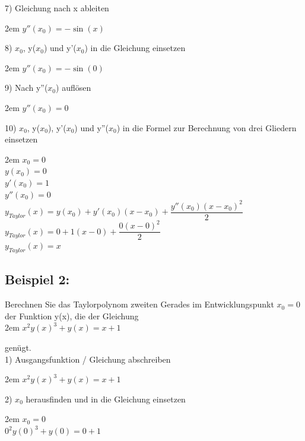 \documentclass[11pt,final]{scrreprt}
\newcommand{\br} {\medskip\\}
\begin{document}
7) Gleichung nach x ableiten

\begingroup
\leftskip2em 
$ y''(x_0) = -\sin(x) $
\par	
\endgroup 

8) $x_0$, y($x_0$) und y'($x_0$) in die Gleichung einsetzen

\begingroup
\leftskip2em 
$y''(x_0) = -\sin(0)$
\par	
\endgroup 

9) Nach y''($x_0$) auflösen

\begingroup
\leftskip2em 
$ y''(x_0) = 0 $\\
\par	
\endgroup 

10) $x_0$, y($x_0$), y'($x_0$) und y''($x_0$) in die Formel zur Berechnung von drei Gliedern einsetzen

\begingroup
\leftskip2em 
$ x_0 = 0$\\
$y(x_0) = 0$\\
$y'(x_0)=1 $\\
$y''(x_0) = 0 $\\
$ y_{Taylor}(x) = y(x_0)+y'(x_0)(x-x_0)+\dfrac{y''(x_0)(x-x_0)^2}{2} $\\
$ y_{Taylor}(x) = 0+1(x-0)+\dfrac{0(x-0)^2}{2} $\\
$ y_{Taylor}(x) = x$\\
\par	
\endgroup 

\newpage
\subsection*{Beispiel 2:}

Berechnen Sie das Taylorpolynom zweiten Gerades im Entwicklungspunkt $x_0=0$ der Funktion y(x), die der Gleichung \\

\begingroup
\leftskip2em 
$ x^2y(x)^3+y(x)=x+1 $\\
\par	
\endgroup 

genügt. \br

1) Ausgangsfunktion / Gleichung abschreiben

\begingroup
\leftskip2em 
$ x^2y(x)^3+y(x)=x+1 $
\par	
\endgroup 

2) $x_0$ herausfinden und in die Gleichung einsetzen

\begingroup
\leftskip2em 
$ x_0=0$\\
$ 0^2y(0)^3+y(0)=0+1 $
\par	
\endgroup 
\end{document}
